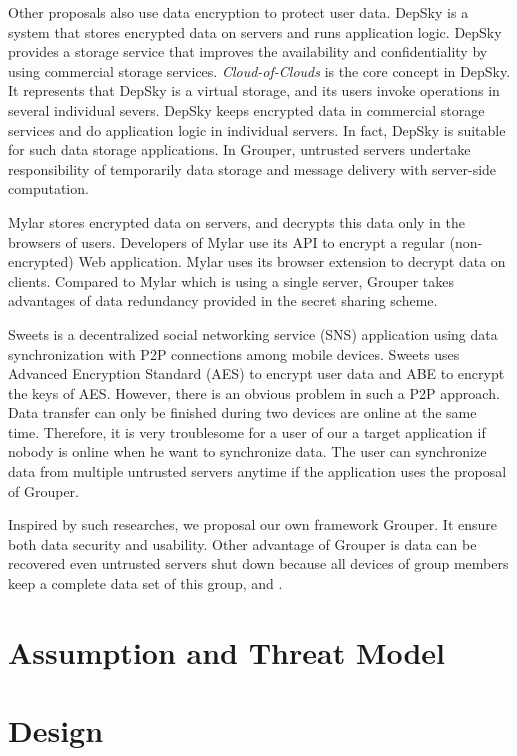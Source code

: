 \documentclass[twocolumn,10pt]{article}
\begin{document}
Other proposals also use data encryption to protect user data.
DepSky\cite{bessani2013depsky} is a system that stores encrypted data on servers and runs application logic. 
DepSky provides a storage service that improves the availability and confidentiality by using commercial storage services. 
\emph{Cloud-of-Clouds} is the core concept in DepSky. 
It represents that DepSky is a virtual storage, and its users invoke operations in several individual severs. 
DepSky keeps encrypted data in commercial storage services and do application logic in individual servers.
In fact, DepSky is suitable for such data storage applications. 
In Grouper, untrusted servers undertake responsibility of temporarily data storage and message delivery with server-side computation.

Mylar\cite{popa2014building} stores encrypted data on servers, and decrypts this data only in the browsers of users. 
Developers of Mylar use its API to encrypt a regular (non-encrypted) Web application. 
Mylar uses its browser extension to decrypt data on clients. 
Compared to Mylar which is using a single server, Grouper takes advantages of data redundancy provided in the secret sharing scheme.

Sweets\cite{sweets} is a decentralized social networking service (SNS) application using data synchronization with P2P connections among mobile devices. 
Sweets uses Advanced Encryption Standard (AES) to encrypt user data and ABE to encrypt the keys of AES. 
However, there is an obvious problem in such a P2P approach. 
Data transfer can only be finished during two devices are online at the same time. 
Therefore, it is very troublesome for a user of our a target application if nobody is online when he want to synchronize data.
The user can synchronize data from multiple untrusted servers anytime if the application uses the proposal of Grouper.

Inspired by such researches, we proposal our own framework Grouper.
It ensure both data security and usability.
Other advantage of Grouper is data can be recovered even untrusted servers shut down because all devices of group members keep a complete data set of this group, and .

\section{Assumption and Threat Model}

\section{Design}
\end{document}
